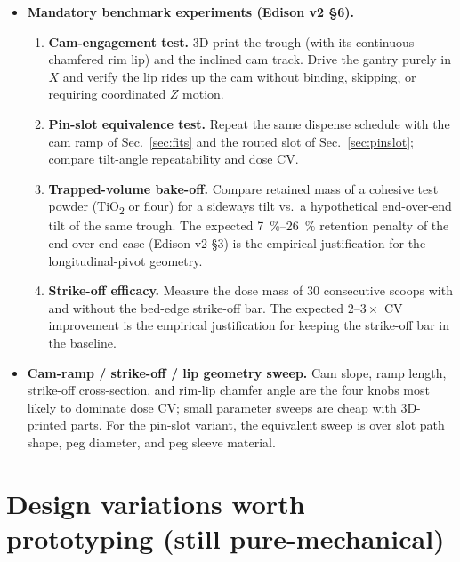 \documentclass[11pt,a4paper]{article}
\begin{document}
\begin{itemize}[leftmargin=*]
    precision dispenser doing both bulk and fine work --- i.e.\ directly
    attack the upstream-loading bottleneck flagged
    by~\cite{tom2024selfdrivinglaboratoriesfor,lunt2023modularmultirobotintegration,lunt2024aroboticworkflow,carruthers2025amobilerobotic}.
  \item \textbf{Mandatory benchmark experiments (Edison v2 \S6).}
    \begin{enumerate}
      \item \textbf{Cam-engagement test.} 3D print the trough (with its
        continuous chamfered rim lip) and the inclined cam track. Drive
        the gantry purely in $X$ and verify the lip rides up the cam
        without binding, skipping, or requiring coordinated $Z$ motion.
      \item \textbf{Pin-slot equivalence test.} Repeat the same dispense
        schedule with the cam ramp of Sec.~\ref{sec:fits} and the routed
        slot of Sec.~\ref{sec:pinslot}; compare tilt-angle repeatability
        and dose CV.
      \item \textbf{Trapped-volume bake-off.} Compare retained mass of a
        cohesive test powder (TiO\textsubscript{2} or flour) for a sideways
        tilt vs.\ a hypothetical end-over-end tilt of the same trough. The
        expected \SIrange{7}{26}{\percent} retention penalty of the
        end-over-end case (Edison v2 \S3) is the empirical justification
        for the longitudinal-pivot geometry.
      \item \textbf{Strike-off efficacy.} Measure the dose mass of 30
        consecutive scoops with and without the bed-edge strike-off bar.
        The expected $2$--$3\times$ CV improvement is the empirical
        justification for keeping the strike-off bar in the baseline.
    \end{enumerate}
  \item \textbf{Cam-ramp / strike-off / lip geometry sweep.} Cam slope,
    ramp length, strike-off cross-section, and rim-lip chamfer angle are
    the four knobs most likely to dominate dose CV; small parameter sweeps
    are cheap with 3D-printed parts. For the pin-slot variant, the
    equivalent sweep is over slot path shape, peg diameter, and peg sleeve
    material.
\end{itemize}

\section{Design variations worth prototyping (still pure-mechanical)}
\label{sec:variations}
\end{document}
